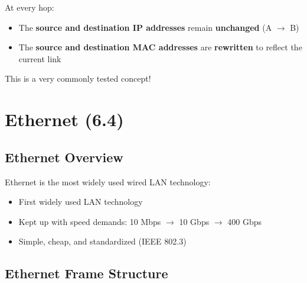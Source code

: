 \begin{warnbox}
At every hop:
\begin{itemize}[noitemsep]
    \item The \textbf{source and destination IP addresses} remain \textbf{unchanged} (A $\to$ B)
    \item The \textbf{source and destination MAC addresses} are \textbf{rewritten} to reflect the current link
\end{itemize}
This is a very commonly tested concept!
\end{warnbox}

\section{Ethernet (6.4)}

\subsection{Ethernet Overview}

\begin{keybox}
Ethernet is the most widely used wired LAN technology:
\begin{itemize}[noitemsep]
    \item First widely used LAN technology
    \item Kept up with speed demands: 10 Mbps $\to$ 10 Gbps $\to$ 400 Gbps
    \item Simple, cheap, and standardized (IEEE 802.3)
\end{itemize}
\end{keybox}

\subsection{Ethernet Frame Structure}

